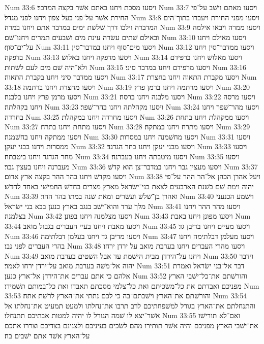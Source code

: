 Num 33:6  ויסעו מסכת ויחנו באתם אשׁר בקצה המדבר׃
Num 33:7  ויסעו מאתם וישׁב על־פי החירת אשׁר על־פני בעל צפון ויחנו לפני מגדל׃
Num 33:8  ויסעו מפני החירת ויעברו בתוך־הים המדברה וילכו דרך שׁלשׁת ימים במדבר אתם ויחנו במרה׃
Num 33:9  ויסעו ממרה ויבאו אילמה ובאילם שׁתים עשׂרה עינת מים ושׁבעים תמרים ויחנו־שׁם׃
Num 33:10  ויסעו מאילם ויחנו על־ים־סוף׃
Num 33:11  ויסעו מים־סוף ויחנו במדבר־סין׃
Num 33:12  ויסעו ממדבר־סין ויחנו בדפקה׃
Num 33:13  ויסעו מדפקה ויחנו באלושׁ׃
Num 33:14  ויסעו מאלושׁ ויחנו ברפידם ולא־היה שׁם מים לעם לשׁתות׃
Num 33:15  ויסעו מרפידם ויחנו במדבר סיני׃
Num 33:16  ויסעו ממדבר סיני ויחנו בקברת התאוה׃
Num 33:17  ויסעו מקברת התאוה ויחנו בחצרת׃
Num 33:18  ויסעו מחצרת ויחנו ברתמה׃
Num 33:19  ויסעו מרתמה ויחנו ברמן פרץ׃
Num 33:20  ויסעו מרמן פרץ ויחנו בלבנה׃
Num 33:21  ויסעו מלבנה ויחנו ברסה׃
Num 33:22  ויסעו מרסה ויחנו בקהלתה׃
Num 33:23  ויסעו מקהלתה ויחנו בהר־שׁפר׃
Num 33:24  ויסעו מהר־שׁפר ויחנו בחרדה׃
Num 33:25  ויסעו מחרדה ויחנו במקהלת׃
Num 33:26  ויסעו ממקהלת ויחנו בתחת׃
Num 33:27  ויסעו מתחת ויחנו בתרח׃
Num 33:28  ויסעו מתרח ויחנו במתקה׃
Num 33:29  ויסעו ממתקה ויחנו בחשׁמנה׃
Num 33:30  ויסעו מחשׁמנה ויחנו במסרות׃
Num 33:31  ויסעו ממסרות ויחנו בבני יעקן׃
Num 33:32  ויסעו מבני יעקן ויחנו בחר הגדגד׃
Num 33:33  ויסעו מחר הגדגד ויחנו ביטבתה׃
Num 33:34  ויסעו מיטבתה ויחנו בעברנה׃
Num 33:35  ויסעו מעברנה ויחנו בעצין גבר׃
Num 33:36  ויסעו מעצין גבר ויחנו במדבר־צן הוא קדשׁ׃
Num 33:37  ויסעו מקדשׁ ויחנו בהר ההר בקצה ארץ אדום׃
Num 33:38  ויעל אהרן הכהן אל־הר ההר על־פי יהוה וימת שׁם בשׁנת הארבעים לצאת בני־ישׂראל מארץ מצרים בחדשׁ החמישׁי באחד לחדשׁ׃
Num 33:39  ואהרן בן־שׁלשׁ ועשׂרים ומאת שׁנה במתו בהר ההר׃
Num 33:40  וישׁמע הכנעני מלך ערד והוא־ישׁב בנגב בארץ כנען בבא בני ישׂראל׃
Num 33:41  ויסעו מהר ההר ויחנו בצלמנה׃
Num 33:42  ויסעו מצלמנה ויחנו בפונן׃
Num 33:43  ויסעו מפונן ויחנו באבת׃
Num 33:44  ויסעו מאבת ויחנו בעיי העברים בגבול מואב׃
Num 33:45  ויסעו מעיים ויחנו בדיבן גד׃
Num 33:46  ויסעו מדיבן גד ויחנו בעלמן דבלתימה׃
Num 33:47  ויסעו מעלמן דבלתימה ויחנו בהרי העברים לפני נבו׃
Num 33:48  ויסעו מהרי העברים ויחנו בערבת מואב על ירדן ירחו׃
Num 33:49  ויחנו על־הירדן מבית הישׁמת עד אבל השׁטים בערבת מואב׃
Num 33:50  וידבר יהוה אל־משׁה בערבת מואב על־ירדן ירחו לאמר׃
Num 33:51  דבר אל־בני ישׂראל ואמרת אלהם כי אתם עברים את־הירדן אל־ארץ כנען׃
Num 33:52  והורשׁתם את־כל־ישׁבי הארץ מפניכם ואבדתם את כל־משׂכיתם ואת כל־צלמי מסכתם תאבדו ואת כל־במותם תשׁמידו׃
Num 33:53  והורשׁתם את־הארץ וישׁבתם־בה כי לכם נתתי את־הארץ לרשׁת אתה׃
Num 33:54  והתנחלתם את־הארץ בגורל למשׁפחתיכם לרב תרבו את־נחלתו ולמעט תמעיט את־נחלתו אל אשׁר־יצא לו שׁמה הגורל לו יהיה למטות אבתיכם תתנחלו׃
Num 33:55  ואם־לא תורישׁו את־ישׁבי הארץ מפניכם והיה אשׁר תותירו מהם לשׂכים בעיניכם ולצנינם בצדיכם וצררו אתכם על־הארץ אשׁר אתם ישׁבים בה׃
